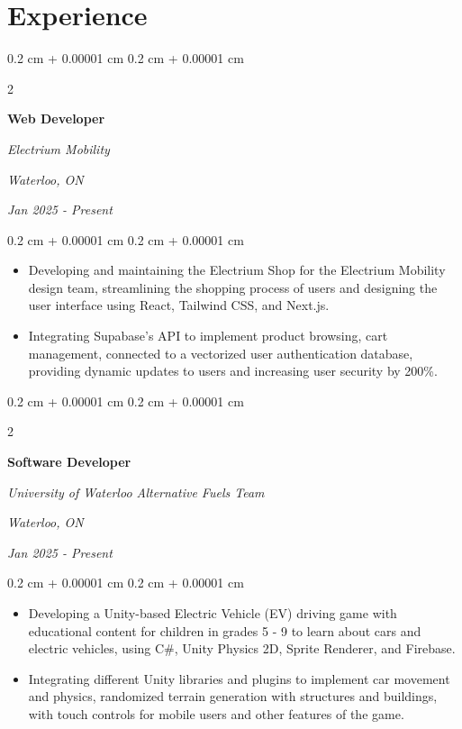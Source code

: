 \documentclass[10pt, letterpaper]{article}
\newenvironment{highlights}{
    \begin{itemize}[
        topsep=0.10 cm,
        parsep=0.10 cm,
        partopsep=0pt,
        itemsep=0pt,
        leftmargin=0.4 cm + 10pt
    ]
}{
    \end{itemize}
} %
\newenvironment{onecolentry}{
    \begin{adjustwidth}{
        0.2 cm + 0.00001 cm
    }{
        0.2 cm + 0.00001 cm
    }
}{
    \end{adjustwidth}
} %
\newenvironment{twocolentry}[2][]{
    \onecolentry
    \def\secondColumn{#2}
    \setcolumnwidth{\fill, 4.5 cm}
    \begin{paracol}{2}
}{
    \switchcolumn \raggedleft \secondColumn
    \end{paracol}
    \endonecolentry
} %
\begin{document}
    \section{Experience}

        \begin{twocolentry}{
        \textit{Waterloo, ON}    
            
        \textit{Jan 2025 - Present}}
            \textbf{Web Developer}
            
            \textit{Electrium Mobility
}
        \end{twocolentry}

        \vspace{0.10 cm}
        \begin{onecolentry}
            \begin{highlights}
                \item Developing and maintaining the Electrium Shop for the Electrium Mobility design team, streamlining the shopping process of users and designing the user interface using React, Tailwind CSS, and Next.js.
                \item Integrating Supabase's API to implement product browsing, cart management, connected to a vectorized user authentication database, providing dynamic updates to users and increasing user security by 200\%.
            \end{highlights}
        \end{onecolentry}

        \vspace{0.2 cm}

        
        \begin{twocolentry}{
        \textit{Waterloo, ON}    
            
        \textit{Jan 2025 - Present}}
            \textbf{Software Developer}
            
            \textit{University of Waterloo Alternative Fuels Team}
        \end{twocolentry}

        \vspace{0.10 cm}
        \begin{onecolentry}
            \begin{highlights}
                \item Developing a Unity-based Electric Vehicle (EV) driving game with educational content for children in grades 5 - 9 to learn about cars and electric vehicles, using C\#, Unity Physics 2D, Sprite Renderer, and Firebase.
                \item Integrating different Unity libraries and plugins to implement car movement and physics, randomized terrain generation with structures and buildings, with touch controls for mobile users and other features of the game.
 
            \end{highlights}
        \end{onecolentry}
        
\end{document}
